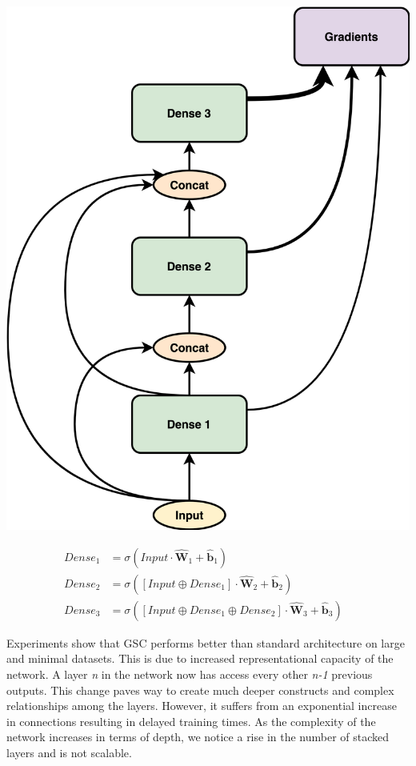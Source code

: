 \documentclass{article}
\let\oldhat\hat
\renewcommand{\hat}[1]{\oldhat{\mathbf{#1}}}
\begin{document}
\noindent\begin{minipage}{.45\textwidth}
   \centering
   \includegraphics[scale=0.09]{GSC.png}
   \label{fig:GSC.png}
\end{minipage}
\begin{minipage}{.45\textwidth}
\begin{equation}
\label{eq:2}
\begin{aligned}
       Dense_{1} &= \sigma(Input \cdot \hat{W}_{1} + \hat{b}_{1}) &\\
       Dense_{2} &= \sigma([Input \oplus Dense_{1}] \cdot \hat{W}_{2} + \hat{b}_{2}) &\\
       Dense_{3} &= \sigma([Input \oplus Dense_{1} \oplus Dense_{2}] \cdot \hat{W}_{3} + \hat{b}_{3}) 
\end{aligned}
\end{equation}
\end{minipage}

Experiments show that GSC performs better than standard architecture on large and minimal datasets. This is due to increased representational capacity of the network. A layer \emph{n} in the network now has access every other \emph{n-1} previous outputs. This change paves way to create much deeper constructs and complex relationships among the layers. However, it suffers from an exponential increase in connections resulting in delayed training times. As the complexity of the network increases in terms of depth, we notice a rise in the number of stacked layers and is not scalable.
\end{document}
